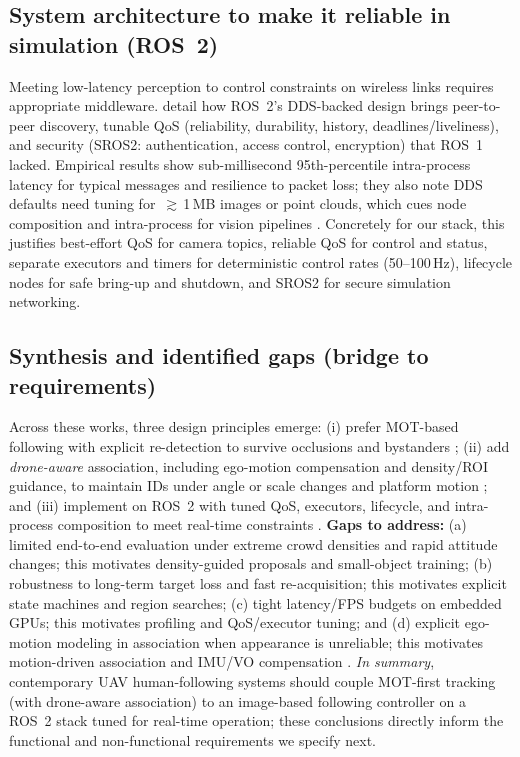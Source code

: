 \documentclass[12pt,a4paper]{report}
\begin{document}
\subsection*{System architecture to make it reliable in simulation (ROS~2)}
Meeting low-latency perception to control constraints on wireless links requires appropriate middleware. \citep{Macenski2022} detail how ROS~2’s \ac{DDS}-backed design brings peer-to-peer discovery, tunable \ac{QoS} (reliability, durability, history, deadlines/liveliness), and security (\ac{SROS2}: authentication, access control, encryption) that ROS~1 lacked. Empirical results show sub-millisecond 95th-percentile intra-process latency for typical messages and resilience to packet loss; they also note \ac{DDS} defaults need tuning for $\,\gtrsim\,$1\,MB images or point clouds, which cues node composition and intra-process for vision pipelines \citep{Macenski2022}. Concretely for our stack, this justifies best-effort \ac{QoS} for camera topics, reliable \ac{QoS} for control and status, separate executors and timers for deterministic control rates (50–100\,Hz), lifecycle nodes for safe bring-up and shutdown, and \ac{SROS2} for secure simulation networking.

\subsection*{Synthesis and identified gaps (bridge to requirements)}
Across these works, three design principles emerge: (i) prefer \ac{MOT}-based following with explicit re-detection to survive occlusions and bystanders \citep{Ferreira2024}; (ii) add \emph{drone-aware} association, including ego-motion compensation and density/\ac{ROI} guidance, to maintain \ac{ID}s under angle or scale changes and platform motion \citep{Wang2024DroneMOT,Lei2024DenseTrack}; and (iii) implement on ROS~2 with tuned \ac{QoS}, executors, lifecycle, and intra-process composition to meet real-time constraints \citep{Macenski2022}. 
\textbf{Gaps to address:} (a) limited end-to-end evaluation under extreme crowd densities and rapid attitude changes; this motivates density-guided proposals and small-object training; (b) robustness to long-term target loss and fast re-acquisition; this motivates explicit state machines and region searches; (c) tight latency/\ac{FPS} budgets on embedded \ac{GPU}s; this motivates profiling and \ac{QoS}/executor tuning; and (d) explicit ego-motion modeling in association when appearance is unreliable; this motivates motion-driven association and \ac{IMU}/\ac{VO} compensation \citep{Ferreira2024,Wang2024DroneMOT,Lei2024DenseTrack,Zhang2022ByteTrack}. 
\emph{In summary}, contemporary \ac{UAV} human-following systems should couple \ac{MOT}-first tracking (with drone-aware association) to an image-based following controller on a ROS~2 stack tuned for real-time operation; these conclusions directly inform the functional and non-functional requirements we specify next.
\end{document}
